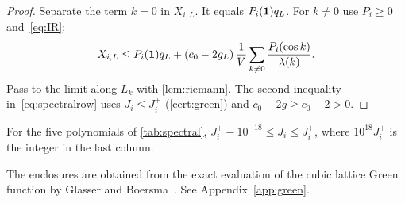 \begin{proof}
Separate the term $k=0$ in $X_{i,L}$. It equals $P_i(\mathbf 1)q_L$. For $k\ne0$ use $P_i\ge0$ and~\eqref{eq:IR}:
\[
 X_{i,L}\le P_i(\mathbf 1)q_L+(c_0-2g_L)\,\frac1V\sum_{k\ne0}\frac{P_i(\cos k)}{\lambda(k)} .
\]
Pass to the limit along $L_k$ with \cref{lem:riemann}. The second inequality in~\eqref{eq:spectralrow} uses $J_i\le J_i^+$ (\cref{cert:green}) and $c_0-2g\ge c_0-2>0$.
\end{proof}

\begin{certificate}\label{cert:green}
For the five polynomials of \cref{tab:spectral}, $J_i^+-10^{-18}\le J_i\le J_i^+$, where $10^{18}J_i^+$ is the integer in the last column.
\end{certificate}

The enclosures are obtained from the exact evaluation of the cubic lattice Green function by Glasser and Boersma~\cite{GB00}. See Appendix~\ref{app:green}.
